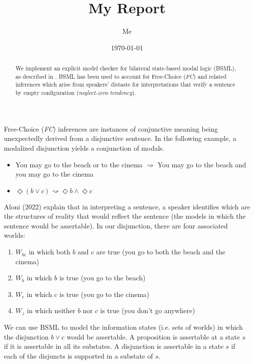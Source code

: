 \documentclass[12pt,a4paper]{article}
\title{My Report}
\author{Me}
\date{\today}
\begin{document}
\maketitle

\begin{abstract}
We implement an explicit model checker for bilateral state-based modal logic
(BSML), as described in \cite{Aloni2024}. BSML has been used to account for
Free-Choice (\textit{FC}) and related inferences which arise from speakers' distaste for
interpretations that verify a sentence by empty configuration  (\textit{neglect-zero tendency}).
\end{abstract}

Free-Choice (\textit{FC}) inferences are instances of conjunctive meaning being unexpectedly
derived from a disjunctive sentence. In the following example, a modalized disjunction yields
a conjunction of modals.

\begin{itemize}
\item You may go to the beach or to the cinema $\rightsquigarrow$ You may go to the beach
 and you may go to the cinema
\item $\Diamond(b\vee c)\rightsquigarrow\Diamond b \wedge \Diamond c$
\end{itemize}

Aloni (2022) explain that in interpreting a sentence, a speaker identifies which are the structures of
reality that would reflect the sentence (the models in which the sentence would be assertable).
In our disjunction, there are four associated worlds:

\begin{enumerate}
\item $W_{bc}$ in which both $b$ and $c$ are true (you go to both the beach and the cinema)
\item $W_b$ in which $b$ is true (you go to the beach)
\item $W_c$ in which $c$ is true (you go to the cinema)
\item $W_z$ in which neither $b$ nor $c$ is true (you don't go anywhere)
\end{enumerate}

We can use BSML to model the information states (i.e. sets of worlds) in which the disjunction $b\vee c$
would be assertable. A proposition is assertable at a state $s$ if it is assertable in all its substates.
A disjunction is assertable in a state $s$ if each of the disjuncts is supported in a substate of $s$.
\end{document}
